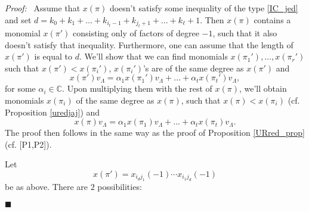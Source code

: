 \documentclass[a4paper, 10pt,oneside]{amsart}
\newenvironment{dokaz}
{\noindent\emph{Proof:}\ }
{\hfill $\blacksquare$}
\begin{document}
\begin{dokaz}
Assume that $x(\pi)$ doesn't satisfy some inequality of the type
\eqref{IC_jed} and set
$d=k_0+k_1+\dots+k_{i_t-1}+k_{j_t+1}+\dots+k_\ell+1$.  Then $x(\pi)$
contains a monomial $x(\pi')$ consisting only of  factors of degree $-1$,
such that it also doesn't satisfy that inequality. Furthermore, one
can assume that the length of $x(\pi')$ is equal to $d$. We'll show
that we can find monomials
$x(\pi_1'),\dots,x(\pi_r')$ such that $x(\pi')<x(\pi_i')$, $x(\pi_i')$'s are of the
same degree as $x(\pi')$ and $$x(\pi')v_\Lambda=\alpha_1 x(\pi_1')v_\Lambda+\dots+\alpha_t
x(\pi_t')v_\Lambda,$$ for some $\alpha_i\in{{\mathbb C}}$. Upon multiplying them with the
rest of $x(\pi)$, we'll obtain monomials $x(\pi_i)$ of the same
degree as $x(\pi)$, such that $x(\pi)<x(\pi_i)$ (cf. Proposition
\ref{uredjaj}) and
$$x(\pi)v_\Lambda=\alpha_1 x(\pi_1)v_\Lambda+\dots+\alpha_t
x(\pi_t)v_\Lambda.$$ The proof then
follows in the same way as the proof of Proposition
\ref{URred_prop} (cf. [P1,P2]).

Let $$x(\pi')=x_{i_d j_1}(-1)\cdots x_{i_1 j_d}(-1)$$ be as above.
There are $2$ possibilities:
\begin{enumerate}


\end{enumerate}
\end{dokaz}
\end{document}
